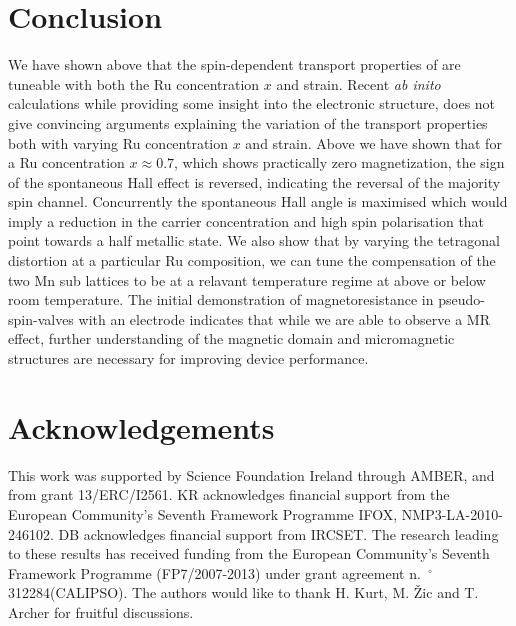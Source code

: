 \documentclass[reprint,aip,apl,floatfix,linenumbers,superscriptaddress]{revtex4-1}
\begin{document}
\section{Conclusion}
\label{sec:conclusion}
We have shown above that the spin-dependent transport properties of  are tuneable with both the Ru concentration $x$ and strain. Recent \textit{ab inito} calculations \cite{galanakisJAP2013} while providing some insight into the electronic structure, does not give convincing arguments explaining the variation of the transport properties both with varying Ru concentration $x$ and strain. Above we have shown that for a Ru concentration $x\approx\num{0.7}$, which shows practically zero magnetization, the sign of the spontaneous Hall effect is reversed, indicating the reversal of the majority spin channel. Concurrently the spontaneous Hall angle is maximised which would imply a reduction in the carrier concentration and high spin polarisation that point towards a half metallic state. We also show that by varying the tetragonal distortion at a particular Ru composition, we can tune the compensation of the two Mn sub lattices to be at a relavant temperature regime at above or below room temperature. 
The initial demonstration of magnetoresistance in pseudo-spin-valves with an  electrode indicates that while we are able to observe a MR effect, further understanding of the magnetic domain and micromagnetic structures are necessary for improving device performance. 
 
\section{Acknowledgements}
\label{sec:acknowledgements}
This work was supported by Science Foundation Ireland through AMBER, and from grant 13/ERC/I2561. KR acknowledges financial support from the
European Community's Seventh Framework Programme IFOX, NMP3-LA-2010-246102. DB acknowledges financial support from IRCSET. The research leading to these results has received funding from the European Community's Seventh Framework Programme (FP7/2007-2013) under grant agreement n.~$^{\circ}$312284(CALIPSO). The authors would like to thank H. Kurt, M. \v{Z}ic and T. Archer for fruitful discussions.


\end{document}
